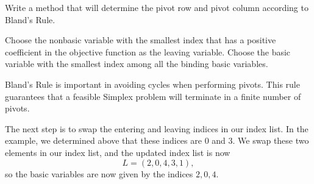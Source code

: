 \begin{problem}
Write a method that will determine the pivot row and pivot column according to Bland's Rule.
\begin{definition}
Choose the nonbasic variable with the smallest index that has a positive coefficient in the objective function
as the leaving variable.  Choose the basic variable with the smallest index among all the binding basic variables.
\end{definition}

Bland's Rule is important in avoiding cycles when performing pivots.
This rule guarantees that a feasible Simplex problem will terminate in a finite number of pivots.
\label{prob:blands}
\end{problem}

The next step is to swap the entering and leaving indices in our index list.
In the example, we determined above that these indices are $0$ and $3$. We swap these two elements in our index list,
and the updated index list is now
\[
L = (2, 0, 4, 3, 1),
\]
so the basic variables are now given by the indices $2, 0, 4$.

